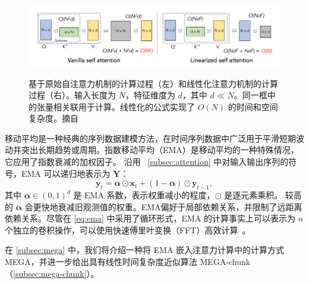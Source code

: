 \begin{figure}[t]
\begin{center}
{\includegraphics[width=1\linewidth]{figs/cosformer/linear3.pdf}}
\vspace{-10mm}
\end{center}
\caption{基于原始自注意力机制的计算过程（左）和线性化注意力机制的计算过程（右）。输入长度为 $N$，特征维度为 $d$，其中 $d\ll N$。同一框中的张量相关联用于计算。线性化的公式实现了 $O(N)$ 的时间和空间复杂度。摘自~\cite{zhen2022cosformer}}
\vspace{-4mm}
\label{fig: linear}
\end{figure}
\vspace{-2mm}


\label{subsec:ema}
移动平均是一种经典的序列数据建模方法，在时间序列数据中广泛用于平滑短期波动并突出长期趋势或周期。指数移动平均（EMA）是移动平均的一种特殊情况，它应用了指数衰减的加权因子。
沿用 ~\ref{subsec:attention} 中对输入输出序列的符号，EMA 可以递归地表示为 $\boldsymbol{Y}$：
\begin{equation}
\label{eq:ema}
\mathbf{y}_t = \boldsymbol{\alpha} \odot \mathbf{x}_t + (1 - \boldsymbol{\alpha}) \odot \mathbf{y}_{t-1},
\end{equation}
其中 $\boldsymbol{\alpha} \in (0, 1)^{d}$ 是 EMA 系数，表示权重减小的程度，$\odot$ 是逐元素乘积。
较高的 $\boldsymbol{\alpha}$ 会更快地衰减旧观测值的权重。EMA偏好于局部依赖关系，并限制了远距离依赖关系。尽管在 \eqref{eq:ema} 中采用了循环形式，EMA 的计算事实上可以表示为 $n$ 个独立的卷积操作，可以使用快速傅里叶变换（FFT）高效计算~\cite{ma2023mega}。

在 \ref{subsec:mega} 中，我们将介绍一种将 EMA 嵌入注意力计算中的计算方式 MEGA，并进一步给出具有线性时间复杂度近似算法 MEGA-chunk（\ref{subsec:mega-chunk}）。